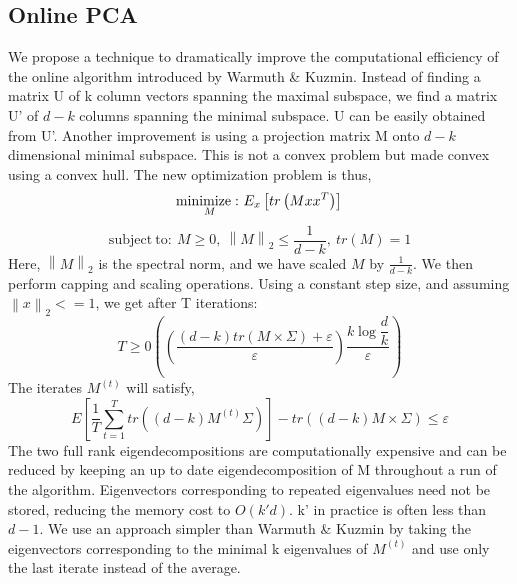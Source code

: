 \documentclass{article}
\begin{document}
\subsection{Online PCA}
We propose a technique to dramatically improve the computational efficiency of the online algorithm introduced by Warmuth \& Kuzmin. Instead of finding a matrix U of k column vectors spanning the maximal subspace, we find a matrix U’ of $d - k$ columns spanning the minimal subspace. U can be easily obtained from U’. Another improvement is using a projection matrix M onto $d - k$ dimensional minimal subspace. This is not a convex problem but made convex using a convex hull. The new optimization problem is thus, 
\begin{equation}
\underset{M}{\mathrm{minimize :\ }}{E}_{x}\left[ tr\left( Mxx^{T}\right)\right] \\
\end{equation}
\begin{equation}
\mathrm{subject\ to :\ }M\geq 0,\ \left\| M\right\| _{2}\leq \dfrac {1}{d-k},\ tr\left( M\right) =1
\end{equation}
Here, $\left\| M\right\| _{2}$ is the spectral norm, and we have scaled $M$ by $\frac{1}{d-k}$. We then perform capping and scaling operations. Using a constant step size, and assuming $\left\| x\right\| _{2} <=1$, we get after T iterations:
\begin{equation}
    T\geq 0\left( \left( \dfrac {\left( d-k\right) tr\left( M\times \Sigma \right) +\varepsilon }{\varepsilon }\right) \dfrac {k\log \dfrac {d}{k}}{\varepsilon }\right) 
\end{equation}
The iterates $M^{(t)}$ will satisfy,
\begin{equation}
    E\left[ \dfrac {1}{T}\sum ^{T}_{t=1}tr\left( \left( d-k\right) M^{\left( t\right) }\Sigma \right) \right] -tr\left( \left( d-k\right) M\times \Sigma \right) \leq \varepsilon 
\end{equation}
The two full rank eigendecompositions are computationally expensive and can be reduced by keeping an up to date eigendecomposition of M throughout a run of the algorithm.
Eigenvectors corresponding to repeated eigenvalues need not be stored, reducing the memory cost to $O\left( k'd\right)$. k’ in practice is often less than $d-1$. We use an approach simpler than Warmuth \& Kuzmin by taking the eigenvectors corresponding to the minimal k eigenvalues of $M^{(t)}$ and use only the last iterate instead of the average.
\end{document}
